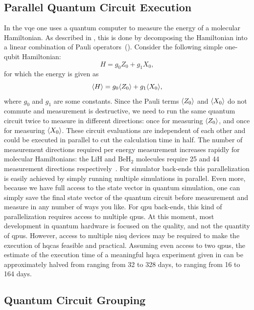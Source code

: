 \subsection{Parallel Quantum Circuit Execution}
In the \gls{vqe} one uses a quantum computer to measure the energy of a molecular Hamiltonian.
As described in , this is done by decomposing the Hamiltonian into a linear combination of Pauli operators~().
Consider the following simple one-qubit Hamiltonian:
\begin{equation}
H = g_0Z_0 + g_1X_0,
\end{equation}
for which the energy is given as
\begin{equation}
\langle{H}\rangle = g_0\langle{Z_0}\rangle + g_1\langle{X_0}\rangle,
\end{equation}
where $g_0$ and $g_1$ are some constants.
Since the Pauli terms $\langle{Z_0}\rangle$ and $\langle{X_0}\rangle$ do not commute and measurement is destructive, we need to run the same quantum circuit twice to measure in different directions: once for measuring $\langle{Z_0}\rangle$, and once for measuring $\langle{X_0}\rangle$.
These circuit evaluations are independent of each other and could be executed in parallel to cut the calculation time in half.
The number of measurement directions required per energy measurement increases rapidly for molecular Hamiltonians: the LiH and $\ensuremath{\mathrm{BeH_2}}$ molecules require 25 and 44 measurement directions respectively~\cite[Supplementary Information, Section III]{kandala2017hardware}.
For simulator back-ends this parallelization is easily achieved by simply running multiple simulations in parallel.
Even more, because we have full access to the state vector in quantum simulation, one can simply save the final state vector of the quantum circuit before measurement and measure in any number of ways you like.
For \gls{qpu} back-ends, this kind of parallelization requires access to multiple \glspl{qpu}.
At this moment, most development in quantum hardware is focused on the quality, and not the quantity of \glspl{qpu}.
However, access to multiple \gls{nisq} devices may be required to make the execution of \glspl{hqca} feasible and practical.
Assuming even access to two \glspl{qpu}, the estimate of the execution time of a meaningful \gls{hqca} experiment given in  can be approximately halved from ranging from 32 to 328 days, to ranging from 16 to 164 days.

\subsection{Quantum Circuit Grouping}
